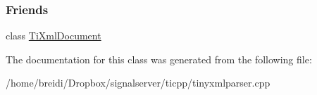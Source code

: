 \subsubsection*{Friends}
\begin{DoxyCompactItemize}
\item 
\hypertarget{class_ti_xml_parsing_data_a173617f6dfe902cf484ce5552b950475}{
class \hyperlink{class_ti_xml_parsing_data_a173617f6dfe902cf484ce5552b950475}{TiXmlDocument}}
\label{class_ti_xml_parsing_data_a173617f6dfe902cf484ce5552b950475}

\end{DoxyCompactItemize}


The documentation for this class was generated from the following file:\begin{DoxyCompactItemize}
\item 
/home/breidi/Dropbox/signalserver/ticpp/tinyxmlparser.cpp\end{DoxyCompactItemize}
